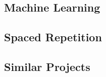 \subsection{Machine Learning} \label{background_machinelearning}
\subsection{Spaced Repetition} \label{background_spacedrepetition}
\subsection{Similar Projects} \label{background_similarprojects}

